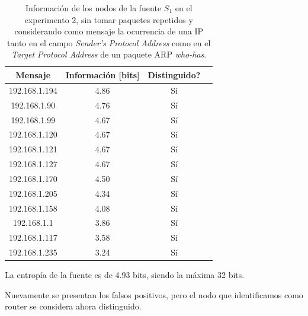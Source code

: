 \begin{table}[t]
    \centering
    \begin{tabular}{ | c | c | c | l |}
        \hline
        Mensaje & Información [bits] & Distinguido?\\
\hline
192.168.1.194 & 4.86 & Sí \\
\hline
192.168.1.90 & 4.76 & Sí \\
\hline
192.168.1.99 & 4.67 & Sí \\
\hline
192.168.1.120 & 4.67 & Sí \\
\hline
192.168.1.121 & 4.67 & Sí \\
\hline
192.168.1.127 & 4.67 & Sí \\
\hline
192.168.1.170 & 4.50 & Sí \\
\hline
192.168.1.205 & 4.34 & Sí \\
\hline
192.168.1.158 & 4.08 & Sí \\
\hline
192.168.1.1 & 3.86 & Sí \\
\hline
192.168.1.117 & 3.58 & Sí \\
\hline
192.168.1.235 & 3.24 & Sí \\
\hline
    \end{tabular} 
    \caption{Información de los nodos de la fuente $S_1$ en el experimento 2, sin tomar paquetes repetidos y considerando como mensaje la ocurrencia de una IP tanto en el campo \textit{Sender's Protocol Address} como en el \textit{Target Protocol Address} de un paquete ARP \textit{who-has}.}
    \label{tab2A}
\end{table} 

\par La entropía de la fuente es de 4.93 bits, siendo la máxima 32 bits. 

\par Nuevamente se presentan los falsos positivos, pero el nodo que identificamos como router se considera ahora distinguido.
